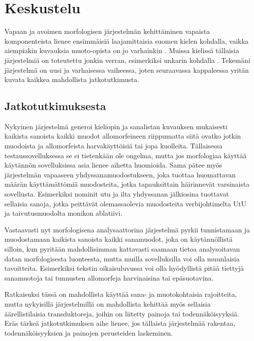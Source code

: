 \documentclass[free]{flammie}
\begin{document}
\section{Keskustelu}

Vapaan ja avoimen morfologisen järjestelmän kehittäminen vapaista komponenteista lienee ensimmäisiä laajamittaisia suomen kielen kohdalla, vaikka aiempiakin kuvauksia muoto-opista on jo varhainkin \cite{koskenniemi1983twolevel}. Muissa kielissä tällaisia järjestelmiä on toteutettu jonkin verran, esimerkiksi unkarin kohdalla
\cite{tron2005hunmorph}. Tekemäni järjestelmä on uusi ja varhaisessa vaiheessa, joten
seuraavassa kappaleessa yritän kuvata kaikkea mahdollista jatkotutkimusta.

\subsection{Jatkotutkimuksesta}

Nykyinen järjestelmä generoi kieliopin ja sanalistan kuvauksen mukaisesti kaikista sanoista kaikki muodot allomorfeineen riippumatta siitä ovatko jotkin muodoista ja allomorfeista harvakäyttöisiä tai jopa kuolleita. Tällaisessa testaussovelluksessa se ei tietenkään ole ongelma, mutta jos morfologiaa käyttää käytännön
sovelluksissa asia lienee aihetta huomioida. Sama pätee myös järjestelmän vapaaseen yhdyssanamuodostukseen, joka tuottaa huomattavan määrän käyttämättömiä muodosteita, jotka tapauksittain häirinnevät varsinaista sovellusta. Esimerkiksi nominit utu ja ilta yhdyssanan jälkiosina tuottavat sellaisia sanoja, jotka peittävät olemassaolevia muodosteita verbijohtimelta UtU ja taivutusmuodolta monikon ablatiivi.

Vastaavasti nyt morfologisena analysaattorina järjestelmä pyrkii tunnistamaan ja
muodostamaan kaikista sanoista kaikki sanamuodot, joka on käytännöllistä silloin, kun pyritään mahdollisimman kattavasti saamaan tietoa analysoitavan datan
morfologisesta luonteesta, mutta muilla sovelluksilla voi olla muunlaisia tavoitteita. Esimerkiksi tekstin oikaisuluvussa voi olla hyödyllistä pitää tiettyjä sanamuotoja tai tunnusten allomorfeja harvinaisina tai epäsuotavina.

Ratkaisuksi tässä on mahdollista käyttää sana- ja muotokohtaisia rajoitteita, mutta nykyisillä järjestelmillä on mahdollista kehittää myös sellaisia äärellistilaisia
transduktoreja, joihin on liitetty painoja tai todennäköisyyksiä. Eräs tärkeä jatkotutkimuksen aihe lienee, jos tällaista järjestelmää rakentaa, todennäköisyyksien ja
painojen perusteiden laskeminen.
\end{document}
